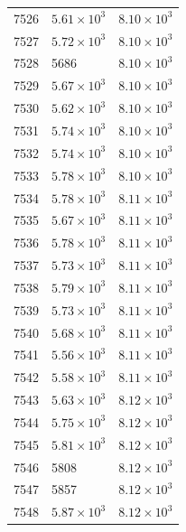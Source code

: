 \begin{table}[H]
\begin{tabular}{lll}
7526 & $\displaystyle 5.61 \times 10^{3}$ & $\displaystyle 8.10 \times 10^{3}$ \\
7527 & $\displaystyle 5.72 \times 10^{3}$ & $\displaystyle 8.10 \times 10^{3}$ \\
7528 & 5686 & $\displaystyle 8.10 \times 10^{3}$ \\
7529 & $\displaystyle 5.67 \times 10^{3}$ & $\displaystyle 8.10 \times 10^{3}$ \\
7530 & $\displaystyle 5.62 \times 10^{3}$ & $\displaystyle 8.10 \times 10^{3}$ \\
7531 & $\displaystyle 5.74 \times 10^{3}$ & $\displaystyle 8.10 \times 10^{3}$ \\
7532 & $\displaystyle 5.74 \times 10^{3}$ & $\displaystyle 8.10 \times 10^{3}$ \\
7533 & $\displaystyle 5.78 \times 10^{3}$ & $\displaystyle 8.10 \times 10^{3}$ \\
7534 & $\displaystyle 5.78 \times 10^{3}$ & $\displaystyle 8.11 \times 10^{3}$ \\
7535 & $\displaystyle 5.67 \times 10^{3}$ & $\displaystyle 8.11 \times 10^{3}$ \\
7536 & $\displaystyle 5.78 \times 10^{3}$ & $\displaystyle 8.11 \times 10^{3}$ \\
7537 & $\displaystyle 5.73 \times 10^{3}$ & $\displaystyle 8.11 \times 10^{3}$ \\
7538 & $\displaystyle 5.79 \times 10^{3}$ & $\displaystyle 8.11 \times 10^{3}$ \\
7539 & $\displaystyle 5.73 \times 10^{3}$ & $\displaystyle 8.11 \times 10^{3}$ \\
7540 & $\displaystyle 5.68 \times 10^{3}$ & $\displaystyle 8.11 \times 10^{3}$ \\
7541 & $\displaystyle 5.56 \times 10^{3}$ & $\displaystyle 8.11 \times 10^{3}$ \\
7542 & $\displaystyle 5.58 \times 10^{3}$ & $\displaystyle 8.11 \times 10^{3}$ \\
7543 & $\displaystyle 5.63 \times 10^{3}$ & $\displaystyle 8.12 \times 10^{3}$ \\
7544 & $\displaystyle 5.75 \times 10^{3}$ & $\displaystyle 8.12 \times 10^{3}$ \\
7545 & $\displaystyle 5.81 \times 10^{3}$ & $\displaystyle 8.12 \times 10^{3}$ \\
7546 & 5808 & $\displaystyle 8.12 \times 10^{3}$ \\
7547 & 5857 & $\displaystyle 8.12 \times 10^{3}$ \\
7548 & $\displaystyle 5.87 \times 10^{3}$ & $\displaystyle 8.12 \times 10^{3}$ \\

\end{tabular}
\end{table}
